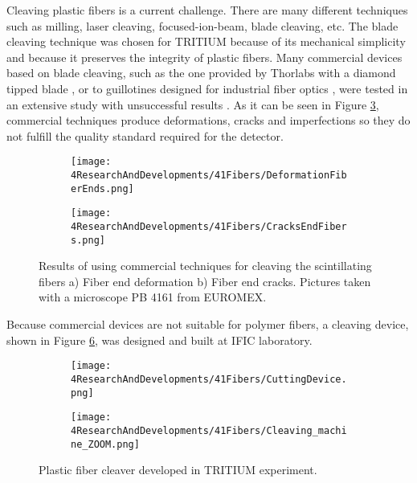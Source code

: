 Cleaving plastic fibers is a current challenge. There are many different techniques such as milling, laser cleaving, focused-ion-beam, blade cleaving, etc. The blade cleaving technique was chosen for TRITIUM because of its mechanical simplicity and because it preserves the integrity of plastic fibers. Many commercial devices based on blade cleaving, such as the one provided by Thorlabs with a diamond tipped blade \cite{DiamondThorlabs}, or to guillotines designed for industrial fiber optics \cite{GuillotineIFO}, were tested in an extensive study with unsuccessful results \cite{TFGAlberto}. As it can be seen in Figure \ref{fig:BadCleavesOfFibers}, commercial techniques produce deformations, cracks and imperfections so they do not fulfill the quality standard required for the detector.
\begin{figure}
\centering
    \begin{subfigure}[b]{0.5\textwidth}
    \centering
    \texttt{[image: 4ResearchAndDevelopments/41Fibers/DeformationFiberEnds.png]}  
    \caption{\label{subfig:FiberEndDeformation}}
    \end{subfigure}
    \hfill
    \begin{subfigure}[b]{0.45\textwidth}
    \centering
    \texttt{[image: 4ResearchAndDevelopments/41Fibers/CracksEndFibers.png]}  
    \caption{\label{subfig:FiberEndCracks}}
    \end{subfigure}
 \caption{Results of using commercial techniques for cleaving the scintillating fibers a) Fiber end deformation b) Fiber end cracks. Pictures taken with a microscope PB 4161 from EUROMEX.}
 \label{fig:BadCleavesOfFibers}
\end{figure}
Because commercial devices are not suitable for polymer fibers, a cleaving device, shown in Figure \ref{fig:CleaveTRITIUMDevice}, was designed and built at IFIC laboratory.
\begin{figure}
\centering
    \begin{subfigure}[b]{0.5\textwidth}
    \centering
    \texttt{[image: 4ResearchAndDevelopments/41Fibers/CuttingDevice.png]}  
    \caption{\label{subfig:CleaveTRITIUMDevice1}}
    \end{subfigure}
    \hfill
    \begin{subfigure}[b]{0.45\textwidth}
    \centering
    \texttt{[image: 4ResearchAndDevelopments/41Fibers/Cleaving\_machine\_ZOOM.png]}  
    \caption{\label{subfig:CleaveTRITIUMDeviceZOOM}}
    \end{subfigure}
 \caption{Plastic fiber cleaver developed in TRITIUM experiment. \label{fig:CleaveTRITIUMDevice}}
\end{figure}
